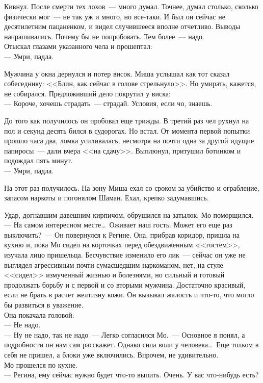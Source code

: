 Кивнул. После смерти тех лохов~--- много думал. Точнее, думал столько, сколько 
физически мог~--- не так уж и много, но все-таки. И был он сейчас не 
десятилетним пацаненком, и видел случившееся вполне отчетливо. Выводы напрашивались. Почему 
бы не попробовать. Тем более~--- надо.\\
Отыскал глазами указанного чела и прошептал:\\
--- Умри, падла.


Мужчина у окна дернулся и потер висок. Миша услышал как тот сказал собеседнику: 
<<Блин, как сейчас в голове стрельнуло>>. Но умирать, кажется, не собирался. 
Предложивший дело покрутил у виска:\\
--- Короче, хочешь страдать~--- страдай. Условия, если чо, знаешь.

До того как получилось он пробовал еще трижды. В третий раз чел рухнул на пол и 
секунд десять бился в судорогах. Но встал. От момента первой попытки прошло 
часа два, ломка усиливалась, несмотря на почти одна за другой идущие папиросы~--- 
дали вчера <<на сдачу>>. Выплюнул, притушил ботинком и подождал пять минут.\\
--- Умри, падла.

На этот раз получилось. На зону Миша ехал со сроком за убийство и ограбление, 
запасом наркоты и погонялом Шаман. Ехал, крепко задумавшись.

\newpage

\noindent Удар, догнавшим давешним кирпичом, обрушился на затылок. Мо поморщился.\\
--- На самом интересном месте\ldots\ Оживает наш гость. Может его еще раз 
выключить?~--- Он повернулся к Регине. Она, прибрав коридор, пришла на кухню и, пока Мо сидел 
на корточках перед обездвиженным <<гостем>>, изучала лицо пришельца. 
Бесчувствие изменило его лик~--- сейчас он уже не выглядел агрессивным почти сумасшедшим 
наркоманом, нет, на стуле <<сидел>> измученный жизнью и болезнями, но сильный и 
готовый продолжать борьбу и с первой и со вторыми мужчина. Достаточно красивый, 
если не брать в расчет желтизну кожи. Он вызывал жалость и что-то, что могло бы 
развиться в уважение.\\
Она покачала головой:\\
--- Не надо.\\
--- Ну не надо, так не надо~--- Легко согласился Мо.~--- Основное я понял, а 
подробности он нам сам расскажет. Однако сила воли у человека\ldots\ Еще толком 
в себя не пришел, а блоки уже включились. Впрочем, не удивительно.\\
Мо прошелся по кухне.\\
--- Регина, ему сейчас нужно будет что-то выпить. Очень. У вас что-нибудь есть?


